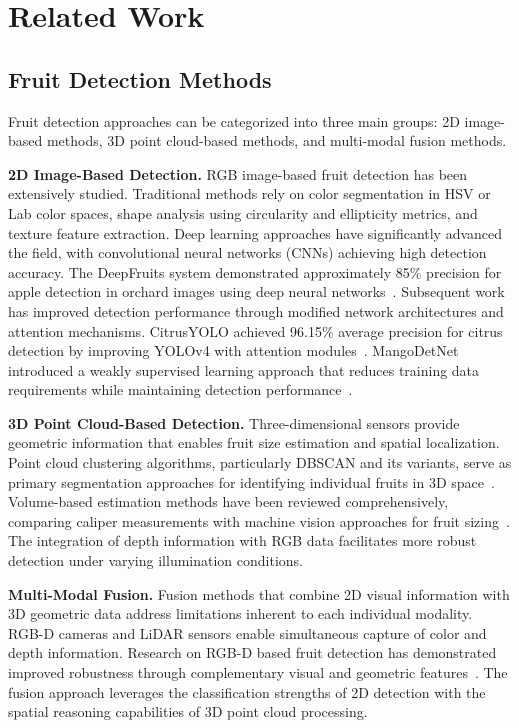 \section{Related Work}
\label{sec:related_work}

\subsection{Fruit Detection Methods}
Fruit detection approaches can be categorized into three main groups: 2D image-based methods, 3D point cloud-based methods, and multi-modal fusion methods.

\textbf{2D Image-Based Detection.} RGB image-based fruit detection has been extensively studied. Traditional methods rely on color segmentation in HSV or Lab color spaces, shape analysis using circularity and ellipticity metrics, and texture feature extraction. Deep learning approaches have significantly advanced the field, with convolutional neural networks (CNNs) achieving high detection accuracy. The DeepFruits system demonstrated approximately 85\% precision for apple detection in orchard images using deep neural networks~\citep{Sa_2016}. Subsequent work has improved detection performance through modified network architectures and attention mechanisms. CitrusYOLO achieved 96.15\% average precision for citrus detection by improving YOLOv4 with attention modules~\citep{Chen_2022}. MangoDetNet introduced a weakly supervised learning approach that reduces training data requirements while maintaining detection performance~\citep{Denarda_2024}.

\textbf{3D Point Cloud-Based Detection.} Three-dimensional sensors provide geometric information that enables fruit size estimation and spatial localization. Point cloud clustering algorithms, particularly DBSCAN and its variants, serve as primary segmentation approaches for identifying individual fruits in 3D space~\citep{Ester_1996}. Volume-based estimation methods have been reviewed comprehensively, comparing caliper measurements with machine vision approaches for fruit sizing~\citep{Neupane_2023}. The integration of depth information with RGB data facilitates more robust detection under varying illumination conditions.

\textbf{Multi-Modal Fusion.} Fusion methods that combine 2D visual information with 3D geometric data address limitations inherent to each individual modality. RGB-D cameras and LiDAR sensors enable simultaneous capture of color and depth information. Research on RGB-D based fruit detection has demonstrated improved robustness through complementary visual and geometric features~\citep{Tu_2020}. The fusion approach leverages the classification strengths of 2D detection with the spatial reasoning capabilities of 3D point cloud processing.

